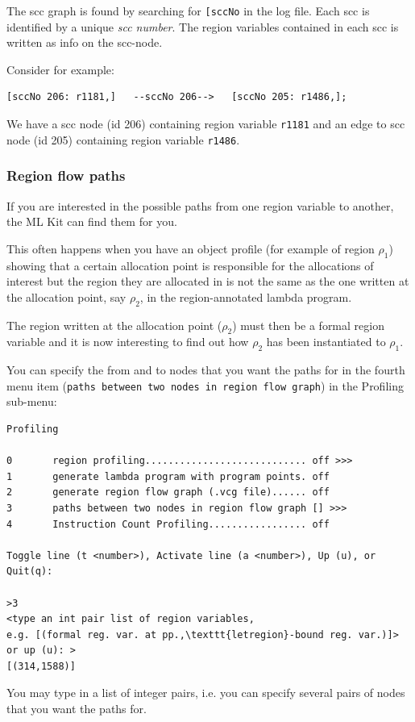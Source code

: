 \documentclass[12pt]{book}
\begin{document}
The scc graph is found by searching for \texttt{[sccNo} in the log
file. Each scc is identified by a unique \emph{scc number}. The region
variables contained in each scc is written as info on the scc-node.

Consider for example:
\begin{verbatim}
[sccNo 206: r1181,]   --sccNo 206-->   [sccNo 205: r1486,];
\end{verbatim}
\noindent
We have a scc node (id 206) containing region variable \texttt{r1181} and
an edge to scc node (id 205) containing region variable
\texttt{r1486}.

\subsubsection{Region flow paths\label{regFlowPath.sec}}
If you are interested in the possible paths from
one region variable to another, the ML Kit can find them for you.

This often happens when you have an object profile (for example of
region $\rho_1$) showing that a certain allocation point is
responsible for the allocations of interest but the region they are
allocated in is not the same as the one written at the allocation
point, say $\rho_2$, in the region-annotated lambda program.

The region written at the allocation point ($\rho_2$) must then be a formal
region variable and it is now interesting to find out how $\rho_2$ has been
instantiated to $\rho_1$.

You can specify the from and to nodes that you want the paths for in the
fourth menu item (\texttt{paths between two nodes in region flow
  graph}) in the
Profiling sub-menu:

\begin{footnotesize}
\begin{verbatim}
Profiling

0       region profiling............................ off >>>
1       generate lambda program with program points. off
2       generate region flow graph (.vcg file)...... off
3       paths between two nodes in region flow graph [] >>>
4       Instruction Count Profiling................. off

Toggle line (t <number>), Activate line (a <number>), Up (u), or Quit(q): 

>3
<type an int pair list of region variables,
e.g. [(formal reg. var. at pp.,\texttt{letregion}-bound reg. var.)]> or up (u): >
[(314,1588)]
\end{verbatim}
\end{footnotesize}
\noindent
You may type in a list of integer pairs, i.e. you can specify several
pairs of nodes that you want the paths for.
\end{document}
